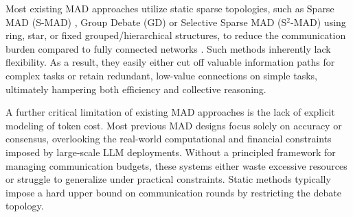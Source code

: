  Most existing MAD approaches utilize static sparse topologies, such as Sparse MAD (S-MAD) \citep{li2024improving}, Group Debate (GD) \citep{liu2024groupdebate} or Selective Sparse MAD (S$^2$-MAD) \citep{zeng2025s} using ring, star, or fixed grouped/hierarchical structures, to reduce the communication burden compared to fully connected networks \citep{du2023improving,hill2015real,sun2023corex}. Such methods  inherently lack flexibility.  As a result, they easily either cut off valuable information paths for complex tasks or retain redundant, low-value connections on simple tasks, ultimately hampering both efficiency and collective reasoning. 


A further critical limitation of existing MAD approaches is the lack of explicit modeling of token cost. Most previous MAD designs focus solely on accuracy or consensus, overlooking the real-world computational and financial constraints imposed by large-scale LLM deployments. Without a principled framework for managing communication budgets, these systems either waste excessive resources or struggle to generalize under practical constraints. Static methods typically impose a hard upper bound on communication rounds by restricting the debate topology. 

